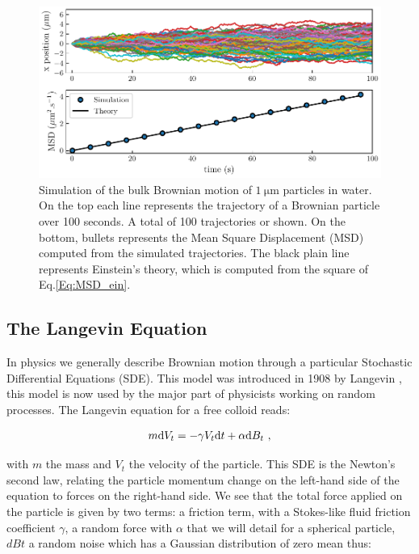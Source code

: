 \begin{figure}[!h]
	\centering
	\includegraphics{02_body/chapter1/image/brown_exemple.pdf}
	\caption{Simulation of the bulk Brownian motion of $1 ~ \mathrm{\mu m}$ particles in water. On the top each line represents the trajectory of a Brownian particle over 100 seconds. A total of 100 trajectories or shown. On the bottom, bullets represents the Mean Square Displacement (\gls{MSD}) computed from the simulated trajectories. The black plain line represents Einstein's theory, which is computed from the square of Eq.\ref{Eq:MSD_ein}.\href{https://github.com/eXpensia/Ma-these/blob/main/02_body/chapter1/image/Simple_theory.ipynb}{\faGithub}}
	\label{fig:bulkbrown}
\end{figure}

\subsection{The Langevin Equation}

In physics we generally describe Brownian motion through a particular Stochastic Differential Equations (\gls{SDE}). This model was introduced in 1908 by Langevin \cite{langevin_sur_1908}, this model is now used by the major part of physicists working on random processes. The Langevin equation for a free colloid reads:

\begin{equation}
	m \textnormal{d}V_t  = - \gamma V_t \textnormal{d}t + \alpha \textnormal{d}B_t ~,
	\label{Eq.langevinEquation}
\end{equation}


with $m$ the mass and $V_t$ the velocity of the particle. This \gls{SDE} is the Newton's second law, relating the particle momentum change on the left-hand side of the equation to forces on the right-hand side. We see that the total force applied on the particle is given by two terms: a friction term, with a Stokes-like fluid friction coefficient $\gamma$, a random force with $\alpha$ that we will detail for a spherical particle, $dBt$ a random noise which has a Gaussian distribution of zero mean thus:

